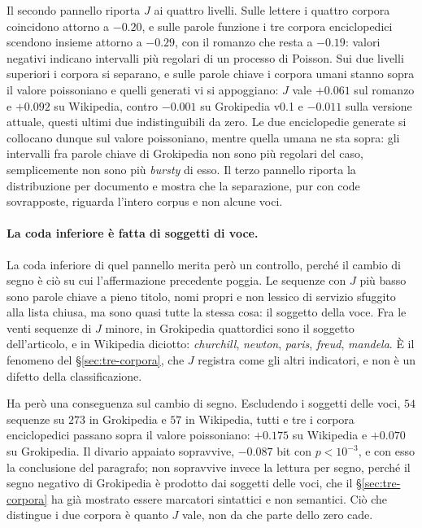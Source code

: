 Il secondo pannello riporta $J$ ai quattro livelli. Sulle lettere i quattro
corpora coincidono attorno a $-0.20$, e sulle parole funzione i tre corpora
enciclopedici scendono insieme attorno a $-0.29$, con il romanzo che resta a
$-0.19$: valori negativi indicano intervalli più regolari di un
processo di Poisson. Sui due livelli superiori i corpora si separano, e sulle
parole chiave i corpora umani stanno sopra il valore poissoniano e quelli
generati vi si appoggiano: $J$ vale $+0.061$ sul romanzo e $+0.092$ su
Wikipedia, contro $-0.001$ su Grokipedia v0.1 e $-0.011$ sulla versione
attuale, questi ultimi due indistinguibili da zero. Le due enciclopedie generate
si collocano dunque sul valore poissoniano, mentre quella umana ne sta sopra:
gli intervalli fra parole chiave di Grokipedia non sono più regolari del caso,
semplicemente non sono più \emph{bursty} di esso. Il terzo pannello riporta la
distribuzione per documento e mostra che la separazione, pur con code
sovrapposte, riguarda l'intero corpus e non alcune voci.

\paragraph{La coda inferiore è fatta di soggetti di voce.}
La coda inferiore di quel pannello merita però un controllo, perché il cambio
di segno è ciò su cui l'affermazione precedente poggia. Le sequenze con $J$
più basso sono parole chiave a pieno titolo, nomi propri e non lessico di
servizio sfuggito alla lista chiusa, ma sono quasi tutte la stessa cosa: il
soggetto della voce. Fra le venti sequenze di $J$ minore, in Grokipedia
quattordici sono il soggetto dell'articolo, e in Wikipedia diciotto:
\emph{churchill}, \emph{newton}, \emph{paris}, \emph{freud}, \emph{mandela}. È
il fenomeno del §\ref{sec:tre-corpora}, che $J$ registra come gli altri
indicatori, e non è un difetto della classificazione.

Ha però una conseguenza sul cambio di segno. Escludendo i soggetti delle voci,
$54$ sequenze su $273$ in Grokipedia e $57$ in Wikipedia, tutti e tre i
corpora enciclopedici passano sopra il valore poissoniano: $+0.175$ su
Wikipedia e $+0.070$ su Grokipedia. Il divario appaiato sopravvive, $-0.087$
bit con $p < 10^{-3}$, e con esso la conclusione del paragrafo; non sopravvive
invece la lettura per segno, perché il segno negativo di Grokipedia è prodotto
dai soggetti delle voci, che il §\ref{sec:tre-corpora} ha già mostrato essere
marcatori sintattici e non semantici. Ciò che distingue i due corpora è quanto
$J$ vale, non da che parte dello zero cade.


